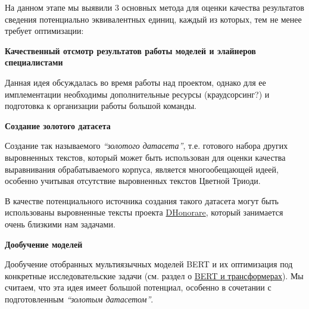 \documentclass[
  letterpaper,
]{book}
\begin{document}
На данном этапе мы выявили 3 основных метода для оценки качества
результатов сведения потенциально эквивалентных единиц, каждый из
которых, тем не менее требует оптимизации:

\begin{tcolorbox}[enhanced jigsaw, colframe=quarto-callout-note-color-frame, rightrule=.15mm, breakable, arc=.35mm, left=2mm, colback=white, bottomrule=.15mm, toprule=.15mm, leftrule=.75mm, opacityback=0]

\textbf{Качественный отсмотр результатов работы моделей и элайнеров
специалистами}\vspace{2mm}

Данная идея обсуждалась во время работы над проектом, однако для ее
имплементации необходимы дополнительные ресурсы (краудсорсинг?) и
подготовка к организации работы большой команды.

\end{tcolorbox}

\begin{tcolorbox}[enhanced jigsaw, colframe=quarto-callout-note-color-frame, rightrule=.15mm, breakable, arc=.35mm, left=2mm, colback=white, bottomrule=.15mm, toprule=.15mm, leftrule=.75mm, opacityback=0]

\textbf{Создание золотого датасета}\vspace{2mm}

Создание так называемого \emph{``золотого датасета''}, т.е. готового
набора других выровненных текстов, который может быть использован для
оценки качества выравнивания обрабатываемого корпуса, является
многообещающей идеей, особенно учитывая отсутствие выровненных текстов
Цветной Триоди.

В качестве потенциального источника создания такого датасета могут быть
использованы выровненные тексты проекта
\href{https://dhonorare.ru/texts/trebnik/molitvy-v-pervyy-den-posle-rozhdeniya-mladentsa}{DHonorare},
который занимается очень близкими нам задачами.

\end{tcolorbox}

\begin{tcolorbox}[enhanced jigsaw, colframe=quarto-callout-note-color-frame, rightrule=.15mm, breakable, arc=.35mm, left=2mm, colback=white, bottomrule=.15mm, toprule=.15mm, leftrule=.75mm, opacityback=0]

\textbf{Дообучение моделей}\vspace{2mm}

Дообучение отобранных мультиязычных моделей BERT и их оптимизация под
конкретные исследовательские задачи (см. раздел о
\protect\hyperlink{sec-about_bert}{BERT и трансформерах}). Мы считаем,
что эта идея имеет большой потенциал, особенно в сочетании с
подготовленным \emph{``золотым датасетом''}.

\end{tcolorbox}
\end{document}
